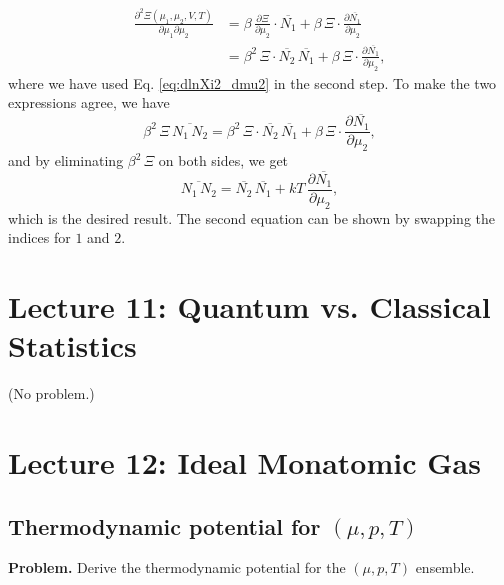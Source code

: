 \documentclass[twocolumn, 10pt]{article}
\numberwithin{equation}{section}
\newenvironment{problem}
{\par\medskip \color{problue}
  \textbf{Problem. }\ignorespaces}
{\medskip}
\newenvironment{solution}[1][\empty]
{\par\medskip\sffamily
  \textbf{\ifx\empty#1{Solution.}\relax\else{#1}\fi} \ignorespaces}
{\medskip}
\begin{document}
\begin{solution}
\begin{align*}
  \frac{ \partial^2 \Xi(\mu_1, \mu_2, V, T) }
       { \partial \mu_1 \partial \mu_2 }
  &=
    \beta \, \frac{ \partial \Xi } { \partial \mu_2 } \cdot
    \overline{ N_1 }
    +
    \beta \, \Xi \cdot
    \frac{ \partial \overline{ N_1 } } { \partial \mu_2 }
  \\
  &=
    \beta^2 \, \Xi \cdot
    \overline{ N_2 } \, \overline{ N_1 }
    +
    \beta \, \Xi \cdot
    \frac{ \partial \overline{ N_1 } } { \partial \mu_2 }
  ,
\end{align*}
%
where we have used Eq. \eqref{eq:dlnXi2_dmu2} in the second step.
To make the two expressions agree, we have
$$
  \beta^2 \, \Xi \, \overline{ N_1 \, N_2 }
  =
  \beta^2 \, \Xi \cdot
  \overline{ N_2 } \, \overline{ N_1 }
  +
  \beta \, \Xi \cdot
  \frac{ \partial \overline{ N_1 } } { \partial \mu_2 }
  ,
$$
and by eliminating $\beta^2 \, \Xi$
on both sides, we get
$$
  \overline{ N_1 \, N_2 }
  =
  \overline{ N_2 } \, \overline{ N_1 }
  +
  kT \,
  \frac{ \partial \overline{ N_1 } } { \partial \mu_2 }
  ,
$$
%
which is the desired result.
%
The second equation can be shown by swapping the indices for $1$ and $2$.
\end{solution}




\section{Lecture 11: Quantum vs. Classical Statistics}

(No problem.)

\section{Lecture 12: Ideal Monatomic Gas}

\subsection{Thermodynamic potential for $(\mu, p, T)$}

\begin{problem}
Derive the thermodynamic potential for the $(\mu, p, T)$ ensemble.
\end{problem}
\end{document}
